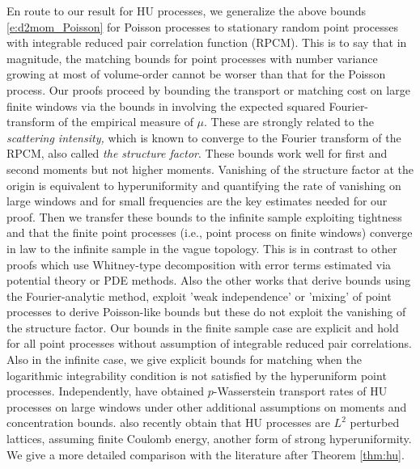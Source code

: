 \documentclass[12pt]{article}
\newcommand{\1}{\mathbf{1}}
\begin{document}
En route to our result for HU processes, we generalize the above bounds \eqref{e:d2mom_Poisson} for Poisson processes to stationary random point processes with integrable reduced pair correlation function (RPCM).  {This is to say that in magnitude, the matching bounds for point processes with number variance growing at most of volume-order cannot be worser than that for the Poisson process.} Our proofs proceed by bounding the transport or matching cost on large finite  windows via the bounds in \cite{bobkov2021simple} involving the
expected  squared Fourier-transform of the empirical measure of $\mu$. {These are strongly} related to the  {\it scattering intensity,}  which is known to converge to the Fourier transform of the RPCM, also called  {\it the structure factor}. These bounds work well for first and second moments but not higher moments. Vanishing of the structure factor at the origin is equivalent to hyperuniformity and quantifying the rate of vanishing on large windows and for small frequencies are the key estimates needed for our proof. Then we transfer these bounds to the infinite sample  {exploiting tightness and that the finite point processes (i.e., point process on finite windows) converge in law to the infinite sample in the vague topology}. This is in contrast to other proofs which use Whitney-type decomposition with error terms estimated via potential theory or PDE methods. Also the other works that derive bounds using the Fourier-analytic method, exploit 'weak independence' or 'mixing' of point processes to derive Poisson-like bounds but these do not exploit the vanishing of the structure factor. Our bounds in the finite sample case are explicit and {hold}  for all point processes without assumption of integrable reduced pair correlations.  Also in the infinite case, we give explicit bounds for matching when the logarithmic integrability condition is not satisfied by the hyperuniform point processes.  {Independently, \cite{butez2024} have obtained $p$-Wasserstein transport rates of HU processes on large windows under other additional assumptions on moments and concentration bounds.}
 {\cite{huesmann2024link} also recently obtain that HU processes are $L^{2}$ perturbed lattices, assuming finite Coulomb energy, another form of strong hyperuniformity.}
We give a more detailed comparison with the literature after Theorem \ref{thm:hu}.
\end{document}
